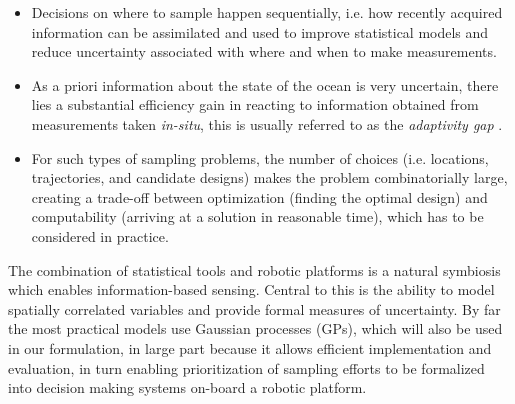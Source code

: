 \documentclass[aoas]{imsart}
\newcommand{\kcomment}[1]{{\color{red}{\{KR: #1\}}}}
\newcommand{\kc}{\kcomment}
\begin{document}
\begin{itemize}
\item Decisions on where to sample happen sequentially, i.e.  how
  recently acquired information can be assimilated and used to improve
  statistical models and reduce uncertainty associated with where and
  when to make measurements.
\item As a priori information about the state of the ocean is very
  uncertain, there lies a substantial efficiency gain in reacting to
  information obtained from measurements taken \emph{in-situ}, this is
  usually referred to as the \emph{adaptivity gap} \kc{citation
    needed}.
\item For such types of sampling problems, the number of choices (i.e.
  locations, trajectories, and candidate designs) makes the problem
  combinatorially large, creating a trade-off between optimization
  (finding the optimal design) and computability (arriving at a
  solution in reasonable time), which has to be considered in
  practice.
\end{itemize}{}

The combination of statistical tools and robotic platforms is a
natural symbiosis which enables information-based sensing. Central to
this is the ability to model spatially correlated variables and
provide formal measures of uncertainty. By far the most practical
models use Gaussian processes (GPs), which will also be used in our
formulation, in large part because it allows efficient implementation
and evaluation, in turn enabling prioritization of sampling efforts to
be formalized into decision making systems on-board a robotic
platform.


\end{document}
